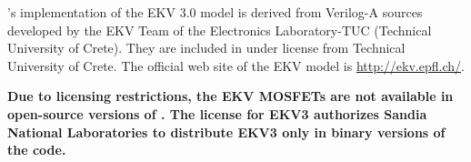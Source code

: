 \Xyce{}'s implementation of the EKV 3.0 model is derived from
Verilog-A sources developed by the EKV Team of the Electronics Laboratory-TUC
(Technical University of Crete).  They are included in \Xyce{} under license
from Technical University of Crete.  The official web site of the EKV model is
\url{http://ekv.epfl.ch/}.

\textbf{Due to licensing restrictions, the EKV MOSFETs are not available in
     open-source versions of \Xyce{}.  The license for EKV3 authorizes Sandia
     National Laboratories to distribute EKV3 only in binary versions of the code.}

